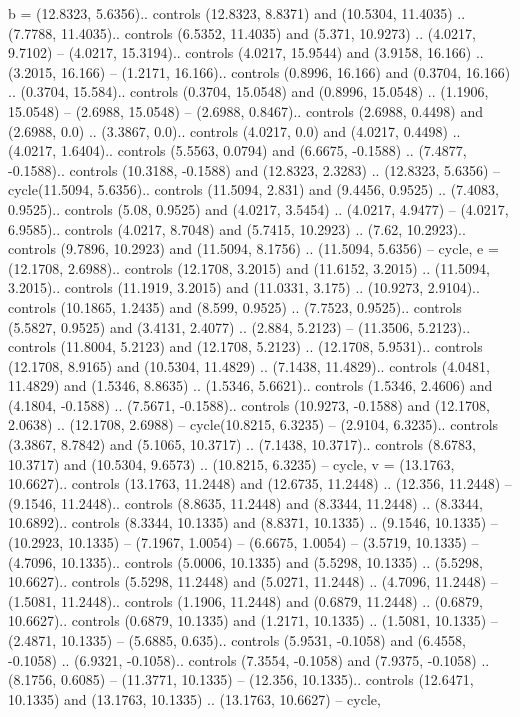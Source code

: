 b = {(12.8323, 5.6356).. controls (12.8323, 8.8371) and (10.5304, 11.4035) .. (7.7788, 11.4035).. controls (6.5352, 11.4035) and (5.371, 10.9273) .. (4.0217, 9.7102) -- (4.0217, 15.3194).. controls (4.0217, 15.9544) and (3.9158, 16.166) .. (3.2015, 16.166) -- (1.2171, 16.166).. controls (0.8996, 16.166) and (0.3704, 16.166) .. (0.3704, 15.584).. controls (0.3704, 15.0548) and (0.8996, 15.0548) .. (1.1906, 15.0548) -- (2.6988, 15.0548) -- (2.6988, 0.8467).. controls (2.6988, 0.4498) and (2.6988, 0.0) .. (3.3867, 0.0).. controls (4.0217, 0.0) and (4.0217, 0.4498) .. (4.0217, 1.6404).. controls (5.5563, 0.0794) and (6.6675, -0.1588) .. (7.4877, -0.1588).. controls (10.3188, -0.1588) and (12.8323, 2.3283) .. (12.8323, 5.6356) -- cycle(11.5094, 5.6356).. controls (11.5094, 2.831) and (9.4456, 0.9525) .. (7.4083, 0.9525).. controls (5.08, 0.9525) and (4.0217, 3.5454) .. (4.0217, 4.9477) -- (4.0217, 6.9585).. controls (4.0217, 8.7048) and (5.7415, 10.2923) .. (7.62, 10.2923).. controls (9.7896, 10.2923) and (11.5094, 8.1756) .. (11.5094, 5.6356) -- cycle},
e = {(12.1708, 2.6988).. controls (12.1708, 3.2015) and (11.6152, 3.2015) .. (11.5094, 3.2015).. controls (11.1919, 3.2015) and (11.0331, 3.175) .. (10.9273, 2.9104).. controls (10.1865, 1.2435) and (8.599, 0.9525) .. (7.7523, 0.9525).. controls (5.5827, 0.9525) and (3.4131, 2.4077) .. (2.884, 5.2123) -- (11.3506, 5.2123).. controls (11.8004, 5.2123) and (12.1708, 5.2123) .. (12.1708, 5.9531).. controls (12.1708, 8.9165) and (10.5304, 11.4829) .. (7.1438, 11.4829).. controls (4.0481, 11.4829) and (1.5346, 8.8635) .. (1.5346, 5.6621).. controls (1.5346, 2.4606) and (4.1804, -0.1588) .. (7.5671, -0.1588).. controls (10.9273, -0.1588) and (12.1708, 2.0638) .. (12.1708, 2.6988) -- cycle(10.8215, 6.3235) -- (2.9104, 6.3235).. controls (3.3867, 8.7842) and (5.1065, 10.3717) .. (7.1438, 10.3717).. controls (8.6783, 10.3717) and (10.5304, 9.6573) .. (10.8215, 6.3235) -- cycle},
v = {(13.1763, 10.6627).. controls (13.1763, 11.2448) and (12.6735, 11.2448) .. (12.356, 11.2448) -- (9.1546, 11.2448).. controls (8.8635, 11.2448) and (8.3344, 11.2448) .. (8.3344, 10.6892).. controls (8.3344, 10.1335) and (8.8371, 10.1335) .. (9.1546, 10.1335) -- (10.2923, 10.1335) -- (7.1967, 1.0054) -- (6.6675, 1.0054) -- (3.5719, 10.1335) -- (4.7096, 10.1335).. controls (5.0006, 10.1335) and (5.5298, 10.1335) .. (5.5298, 10.6627).. controls (5.5298, 11.2448) and (5.0271, 11.2448) .. (4.7096, 11.2448) -- (1.5081, 11.2448).. controls (1.1906, 11.2448) and (0.6879, 11.2448) .. (0.6879, 10.6627).. controls (0.6879, 10.1335) and (1.2171, 10.1335) .. (1.5081, 10.1335) -- (2.4871, 10.1335) -- (5.6885, 0.635).. controls (5.9531, -0.1058) and (6.4558, -0.1058) .. (6.9321, -0.1058).. controls (7.3554, -0.1058) and (7.9375, -0.1058) .. (8.1756, 0.6085) -- (11.3771, 10.1335) -- (12.356, 10.1335).. controls (12.6471, 10.1335) and (13.1763, 10.1335) .. (13.1763, 10.6627) -- cycle},
